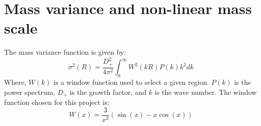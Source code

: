\documentclass[12pt]{article}
\begin{document}
\section{Mass variance and non-linear mass scale}
The mass variance function is given by\cite{ref:halofunction}:
\begin{equation}
	\sigma^{2}(R) = \frac{D_{+}^{2}}{4 \pi^{2}} \int_{0}^{\infty} W^{2}(kR) P(k) k^{2} dk
	\label{eq:massVariation}
\end{equation}
Where, $W(k)$ is a window function used to select a given region. $P(k)$ is the power spectrum, $D_{+}$ is the growth factor, and $k$ is the wave number. The window function chosen for this project is:
\begin{equation}
	W(x) = \frac{3}{x^{3}} \left( \sin(x) - x \cos(x) \right)
	\label{eq:windowFunction}
\end{equation}
\end{document}
